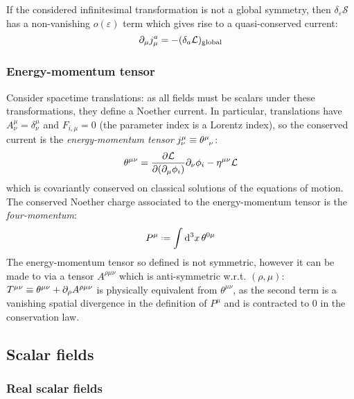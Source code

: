 If the considered infinitesimal transformation is not a global symmetry, then $ \delta_\varepsilon \mathcal{S} $ has a non-vanishing $ o(\varepsilon) $ term which gives rise to a quasi-conserved current:
\begin{equation}
  \partial_\mu j^a_\mu = - (\delta_a \mathcal{L})_\mathrm{global}
  \label{eq:1.65}
\end{equation}

\subsubsection{Energy-momentum tensor}

Consider spacetime translations: as all fields must be scalars under these transformations, they define a Noether current. In particular, translations have $ A^\mu_\nu = \delta^\mu_\nu $ and $ F_{i,\mu} = 0 $ (the parameter index is a Lorentz index), so the conserved current is the \textit{energy-momentum tensor} $ j^\mu_\nu \equiv \tensor{\theta}{^\mu_\nu} $:
\begin{equation}
  \theta^{\mu \nu} = \frac{\partial \mathcal{L}}{\partial (\partial_\mu \phi_i)} \partial_\nu \phi_i - \eta^{\mu \nu} \mathcal{L}
  \label{eq:1.66}
\end{equation}
which is covariantly conserved on classical solutions of the equations of motion. The conserved Noether charge associated to the energy-momentum tensor is the \textit{four-momentum}:
\begin{equation}
  P^\mu \defeq \int \dd^3 x\, \theta^{0 \mu}
  \label{eq:1.67}
\end{equation}
The energy-momentum tensor so defined is not symmetric, however it can be made to via a tensor $ A^{\rho \mu \nu} $ which is anti-symmetric w.r.t. $ (\rho,\mu) $: $ T^{\mu \nu} \equiv \theta^{\mu \nu} + \partial_\rho A^{\rho \mu \nu} $ is physically equivalent from $ \theta^{\mu \nu} $, as the second term is a vanishing spatial divergence in the definition of $ P^\mu $ and is contracted to 0 in the conservation law.

\subsection{Scalar fields}

\subsubsection{Real scalar fields}

